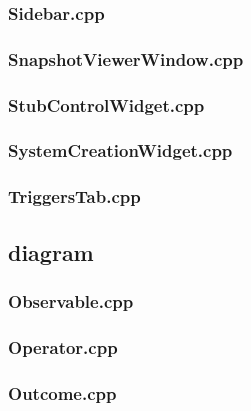 \subsubsection*{Sidebar.cpp}


\subsubsection*{SnapshotViewerWindow.cpp}


\subsubsection*{StubControlWidget.cpp}


\subsubsection*{SystemCreationWidget.cpp}


\subsubsection*{TriggersTab.cpp}


\subsection*{diagram}

\subsubsection*{Observable.cpp}


\subsubsection*{Operator.cpp}


\subsubsection*{Outcome.cpp}


